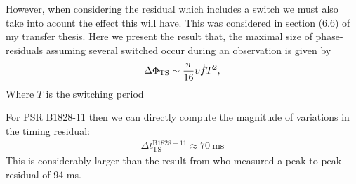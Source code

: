 \documentclass[../full_thesis/full_thesis.tex]{subfiles}
\begin{document}
However, when considering the residual which includes a switch we must also
take into acount the effect this will have. This was considered in section (6.6)
of my transfer thesis. Here we present the result that, the maximal size of phase-residuals
assuming several switched occur during an observation is given by 
\begin{equation}
    \Delta\Phi_{\mathrm{TS}} \sim \frac{\pi}{16} \upsilon \dot{f}  T^{2},
\end{equation}
Where $T$ is the switching period

For PSR B1828-11 then we can directly compute the magnitude of variations in
the timing residual:
\begin{align}
    \Delta t_{\mathrm{TS}}^{\mathrm{B1828-11}} \approx 70\mathrm{~ms}
\end{align}
This is considerably larger than the result from \citet{Lyne2010} who measured a 
peak to peak residual of 94 ms.


\biblio
\end{document}
